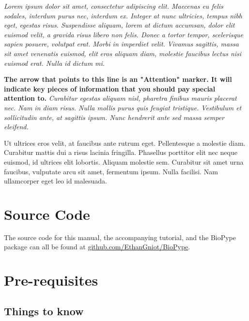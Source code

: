 \textit{Lorem ipsum dolor sit amet, consectetur adipiscing elit. Maecenas eu felis sodales, interdum purus nec, interdum ex. Integer at nunc  ultricies, tempus nibh eget, egestas risus. Suspendisse aliquam, lorem at dictum accumsan, dolor elit euismod velit, a gravida risus libero non felis. Donec a tortor tempor, scelerisque sapien posuere, volutpat erat. Morbi in imperdiet velit. Vivamus sagittis, massa sit amet venenatis euismod, elit eros aliquam diam, molestie faucibus lectus nisi euismod erat. Nulla id dictum mi.}

\attention \textbf{The arrow that points to this line is an "Attention" marker. It will indicate key pieces of information that you should pay special attention to.} \textit{Curabitur egestas aliquam nisl, pharetra finibus mauris placerat nec. Nam in diam risus. Nulla mollis purus quis feugiat tristique. Vestibulum et sollicitudin ante, at sagittis ipsum. Nunc hendrerit ante sed massa semper eleifend.}

 Ut ultrices eros velit, at faucibus ante rutrum eget. Pellentesque a molestie diam. Curabitur mattis dui a risus lacinia fringilla. Phasellus porttitor elit nec neque euismod, id ultrices elit lobortis. Aliquam molestie sem. Curabitur sit amet urna faucibus, vulputate arcu sit amet, fermentum ipsum. Nulla facilisi. Nam ullamcorper eget leo id malesuada.


\section{Source Code}
The source code for this manual, the accompanying tutorial, and the BioPype package can all be found at \url{github.com/EthanGniot/BioPype}.
\section{Pre-requisites}
\subsection*{Things to know}
